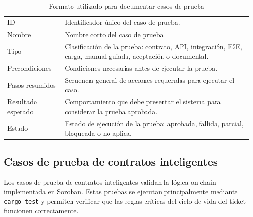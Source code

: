 \documentclass[12pt,letterpaper]{article}
\begin{document}
\begin{table}[H]
\centering
\begingroup
\scriptsize
\setlength{\tabcolsep}{3pt}
\renewcommand{\arraystretch}{1.22}

\begin{tabularx}{\textwidth}{|
>{\raggedright\arraybackslash}p{3.2cm}|
>{\raggedright\arraybackslash}X|}
\hline
\multicolumn{1}{|>{\centering\arraybackslash}m{3.2cm}|}{\textbf{Campo}} &
\multicolumn{1}{>{\centering\arraybackslash}m{11.1cm}|}{\textbf{Descripción}} \\
\hline
ID & Identificador único del caso de prueba. \\
\hline
Nombre & Nombre corto del caso de prueba. \\
\hline
Tipo & Clasificación de la prueba: contrato, API, integración, E2E, carga, manual guiada, aceptación o documental. \\
\hline
Precondiciones & Condiciones necesarias antes de ejecutar la prueba. \\
\hline
Pasos resumidos & Secuencia general de acciones requeridas para ejecutar el caso. \\
\hline
Resultado esperado & Comportamiento que debe presentar el sistema para considerar la prueba aprobada. \\
\hline
Estado & Estado de ejecución de la prueba: aprobada, fallida, parcial, bloqueada o no aplica. \\
\hline
\end{tabularx}

\endgroup
\caption{Formato utilizado para documentar casos de prueba}
\label{tab:formato-casos-prueba}
\end{table}

\subsection{Casos de prueba de contratos inteligentes}

Los casos de prueba de contratos inteligentes validan la lógica on-chain implementada en Soroban. Estas pruebas se ejecutan principalmente mediante \texttt{cargo test} y permiten verificar que las reglas críticas del ciclo de vida del ticket funcionen correctamente.
\end{document}
